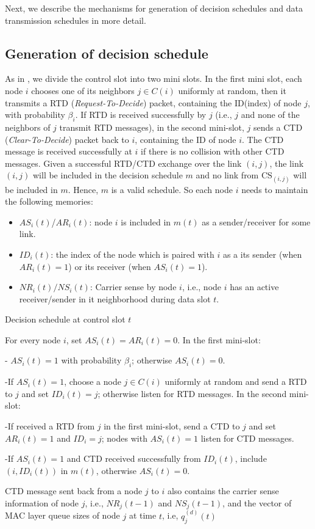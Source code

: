 \documentclass[10pt,onecolumn,draftclsnofoot,journal]{IEEEtran}
\begin{document}
Next, we describe the mechanisms for generation of decision schedules and data transmission schedules in more detail.

\subsection*{Generation of decision schedule}
As in \cite{srikant2}, we divide the control slot into two mini slots. In the first mini slot, each node $i$ chooses one of its neighbors $j \in C(i)$ uniformly at random, then it transmits a RTD (\textit{Request-To-Decide}) packet, containing the ID(index) of node $j$, with probability $\beta_i$. If RTD is received successfully by $j$ (i.e., $j$ and none of the neighbors of $j$ transmit RTD messages), in the second mini-slot, $j$ sends a CTD (\textit{Clear-To-Decide}) packet back to $i$, containing the ID of node $i$. The CTD message is received successfully at $i$ if there is no collision with other CTD messages. Given a successful RTD/CTD exchange over the link $(i,j)$, the link $(i,j)$ will be included in the decision schedule $m$ and no link from $\mathrm{CS}_{(i,j)}$ will be included in $m$. Hence, $m$ is a valid schedule.
So each node $i$ needs to maintain the following memories:
\begin{itemize}
\item $AS_i(t)$/$AR_i(t)$: node $i$ is included in $m(t)$ as a sender/receiver for some link.
\item $ID_i(t)$: the index of the node which is paired with $i$ as a its sender (when $AR_i(t)=1$) or its receiver (when $AS_i(t)=1$).
\item $NR_i(t)/NS_i(t)$: Carrier sense by node $i$, i.e., node $i$ has an active receiver/sender in it neighborhood during data slot $t$.
\end{itemize}
\begin{algorithm}\label{alg dec}
\caption{Decision schedule at control slot $t$ }
\begin{algorithmic}[1]
\STATE For every node $i$, set $AS_i(t)=AR_i(t)=0$.
\STATE In the first mini-slot:

- $AS_i(t)=1$ with probability $\beta_i$; otherwise $AS_i(t)=0$.

-If $AS_i(t)=1$, choose a node $j\in C(i)$ uniformly at random and send a RTD to $j$ and set $ID_i(t)=j$; otherwise listen for RTD messages.
\STATE In the second mini-slot:

-If received a RTD from $j$ in the first mini-slot, send a CTD to $j$ and set $AR_i(t)=1$ and $ID_i=j$; nodes with $AS_i(t)=1$ listen for CTD messages.

-If $AS_i(t)=1$ and CTD received successfully from $ID_i(t)$, include $(i,ID_i(t))$ in $m(t)$, otherwise $AS_i(t)=0$.

\end{algorithmic}
\end{algorithm}
CTD message sent back from a node $j$ to $i$ also contains the carrier sense information of node $j$, i.e., $NR_j(t-1)$ and $NS_j(t-1)$, and the vector of MAC layer queue sizes of node $j$ at time $t$, i.e, $q^{(d)}_j(t)$
\end{document}

